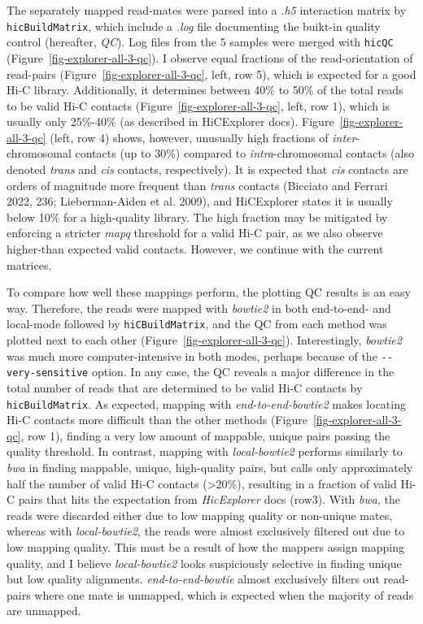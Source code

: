 \documentclass[
  11pt,
  a4paper,
]{scrbook}
\begin{document}
The separately mapped read-mates were parsed into a \emph{.h5}
interaction matrix by \texttt{hicBuildMatrix}, which include a
\emph{.log} file documenting the buikt-in quality control (hereafter,
\emph{QC}). Log files from the 5 samples were merged with \texttt{hicQC}
(Figure~\ref{fig-explorer-all-3-qc}). I observe equal fractions of the
read-orientation of read-pairs (Figure~\ref{fig-explorer-all-3-qc},
left, row 5), which is expected for a good Hi-C library. Additionally,
it determines between 40\% to 50\% of the total reads to be valid Hi-C
contacts (Figure~\ref{fig-explorer-all-3-qc}, left, row 1), which is
usually only 25\%-40\% (as described in HiCExplorer docs).
Figure~\ref{fig-explorer-all-3-qc} (left, row 4) shows, however,
unusually high fractions of \emph{inter}-chromosomal contacts (up to
30\%) compared to \emph{intra}-chromosomal contacts (also denoted
\emph{trans} and \emph{cis} contacts, respectively). It is expected that
\emph{cis} contacts are orders of magnitude more frequent than
\emph{trans} contacts (Bicciato and Ferrari 2022, 236; Lieberman-Aiden
et al. 2009), and HiCExplorer states it is usually below 10\% for a
high-quality library. The high fraction may be mitigated by enforcing a
stricter \emph{mapq} threshold for a valid Hi-C pair, as we also observe
higher-than expected valid contacts. However, we continue with the
current matrices.

To compare how well these mappings perform, the plotting QC results is
an easy way. Therefore, the reads were mapped with \emph{bowtie2} in
both end-to-end- and local-mode followed by \texttt{hiCBuildMatrix}, and
the QC from each method was plotted next to each other
(Figure~\ref{fig-explorer-all-3-qc}). Interestingly, \emph{bowtie2} was
much more computer-intensive in both modes, perhaps because of the
\texttt{-\/-very-sensitive} option. In any case, the QC reveals a major
difference in the total number of reads that are determined to be valid
Hi-C contacts by \texttt{hicBuildMatrix}. As expected, mapping with
\emph{end-to-end-bowtie2} makes locating Hi-C contacts more difficult
than the other methods (Figure~\ref{fig-explorer-all-3-qc}, row 1),
finding a very low amount of mappable, unique pairs passing the quality
threshold. In contrast, mapping with \emph{local-bowtie2} performs
similarly to \emph{bwa} in finding mappable, unique, high-quality pairs,
but calls only approximately half the number of valid Hi-C contacts
(\textgreater20\%), resulting in a fraction of valid Hi-C pairs that
hits the expectation from \emph{HicExplorer} docs (row3). With
\emph{bwa}, the reads were discarded either due to low mapping quality
or non-unique mates, whereas with \emph{local-bowtie2}, the reads were
almost exclusively filtered out due to low mapping quality. This must be
a result of how the mappers assign mapping quality, and I believe
\emph{local-bowtie2} looks suspiciously selective in finding unique but
low quality alignments. \emph{end-to-end-bowtie} almost exclusively
filters out read-pairs where one mate is unmapped, which is expected
when the majority of reads are unmapped.
\end{document}
